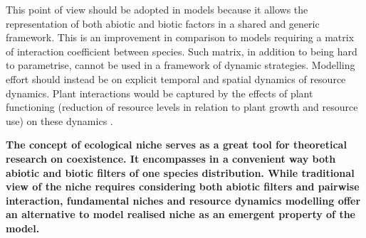 This point of view should be adopted in models \parencite{berger_competition_2008} because it allows the representation of both abiotic and biotic factors in a shared and generic framework. This is an improvement in comparison to models requiring a matrix of interaction coefficient between species. Such matrix, in addition to being hard to parametrise, cannot be used in a framework of dynamic strategies. Modelling effort should instead be on explicit temporal and spatial dynamics of resource dynamics. Plant interactions would be captured by the effects of plant functioning (reduction of resource levels in relation to plant growth and resource use) on these dynamics \parencite{berger_competition_2008, morin_comparing_2009}.


\textbf{The concept of ecological niche serves as a great tool for theoretical research on coexistence. It encompasses in a convenient way both abiotic and biotic filters of one species distribution. While traditional view of the niche requires considering both abiotic filters and pairwise interaction, fundamental niches and resource dynamics modelling offer an alternative to model realised niche as an emergent property of the model.}



